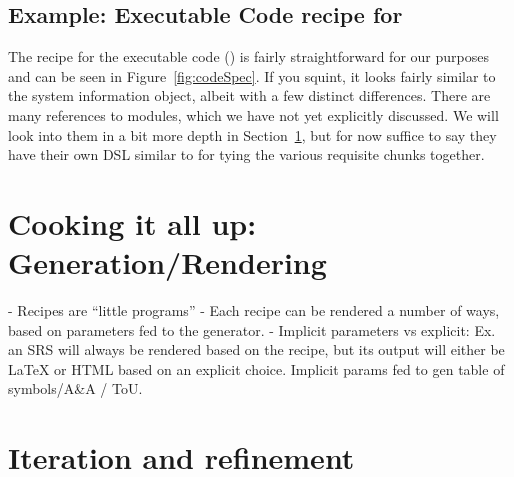 
\subsection{Example: Executable Code recipe for \gb{}}

The recipe for the executable code () is fairly straightforward 
for our purposes and can be seen in Figure~\ref{fig:codeSpec}. If you squint, 
it looks fairly similar to the system information object, albeit with a few 
distinct differences. There are many references to modules, which we have not 
yet explicitly discussed. We will look into them in a bit more depth in 
Section~\ref{sec:gen}, but for now suffice to say they have their own DSL 
similar to  for tying the various requisite chunks together.


\section{Cooking it all up: Generation/Rendering}
\label{sec:gen}
  - Recipes are “little programs”
  - Each recipe can be rendered a number of ways, based on parameters fed to the generator.
  -  Implicit parameters vs explicit: Ex. an SRS will always be rendered based on the recipe, but its output will either be LaTeX or HTML based on an explicit choice. Implicit params fed to gen table of symbols/A\&A / ToU.


\section{Iteration and refinement}
\label{sec:iterefine}

